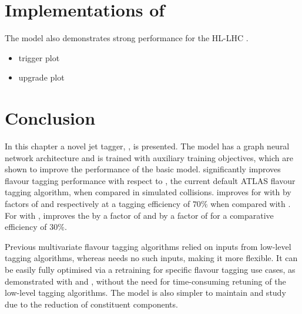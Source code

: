 \section{Implementations of \GNN}\label{sec:gnn_trig_upgrade}

The model also demonstrates strong performance for the HL-LHC \cite{ATL-PHYS-PUB-2022-047}.

\begin{itemize}
    \item trigger plot
    \item upgrade plot
\end{itemize}



\section{Conclusion}\label{sec:gnn_conclusion}

In this chapter a novel jet tagger, \GNN, is presented.
The model has a graph neural network architecture and is trained with auxiliary training objectives, which are shown to improve the performance of the basic model.
\GNN significantly improves flavour tagging performance with respect to \DLr, the current default ATLAS flavour tagging algorithm, when compared in simulated collisions.
\GNN improves \clrej for \ttbarjets with \ttbarpt by factors of \ttbclo and \ttbllo respectively at a \bjet tagging efficiency of $70\%$ when compared with \DLr.
For \Zprimejets with \Zprimept, \GNN improves the \crej by a factor of \zpbclo and \lrej by a factor of \zpbllo for a comparative \bjet efficiency of $30\%$.

Previous multivariate flavour tagging algorithms relied on inputs from low-level tagging algorithms, whereas \GNN needs no such inputs, making it more flexible. It can be easily fully optimised via a retraining for specific flavour tagging use cases, as demonstrated with \ctag and \highpt \btag, without the need for time-consuming retuning of the low-level tagging algorithms.
The model is also simpler to maintain and study due to the reduction of constituent components.

